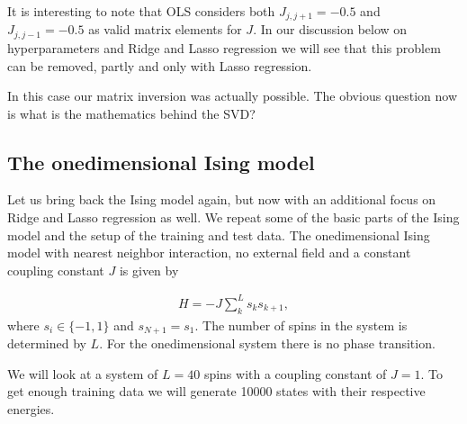 \documentclass[letterpaper,10pt,english]{sphinxmanual}
\begin{document}
It is interesting to note that OLS
considers both \(J_{j, j + 1} = -0.5\) and \(J_{j, j - 1} = -0.5\) as
valid matrix elements for \(J\).
In our discussion below on hyperparameters and Ridge and Lasso regression we will see that
this problem can be removed, partly and only with Lasso regression.

In this case our matrix inversion was actually possible. The obvious question now is what is the mathematics behind the SVD?


\subsection{The one\sphinxhyphen{}dimensional Ising model}
\label{\detokenize{chapter4:the-one-dimensional-ising-model}}
Let us bring back the Ising model again, but now with an additional
focus on Ridge and Lasso regression as well. We repeat some of the
basic parts of the Ising model and the setup of the training and test
data.  The one\sphinxhyphen{}dimensional Ising model with nearest neighbor
interaction, no external field and a constant coupling constant \(J\) is
given by




\begin{equation*}
\begin{split}
\begin{equation}
    H = -J \sum_{k}^L s_k s_{k + 1},
\label{_auto8} \tag{8}
\end{equation}
\end{split}
\end{equation*}
where \(s_i \in \{-1, 1\}\) and \(s_{N + 1} = s_1\). The number of spins in the system is determined by \(L\). For the one\sphinxhyphen{}dimensional system there is no phase transition.

We will look at a system of \(L = 40\) spins with a coupling constant of \(J = 1\). To get enough training data we will generate 10000 states with their respective energies.
\end{document}

